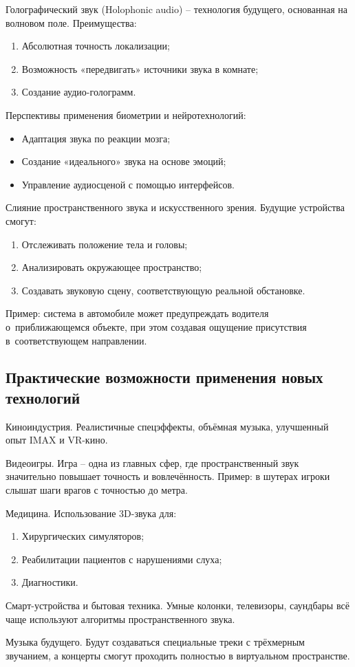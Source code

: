 \documentclass{ou}
\begin{document}
Голографический звук (Holophonic audio) -- технология будущего, основанная на волновом поле. Преимущества:
\begin{enumerate}[leftmargin=0em, itemindent=3.75em, nosep, label=\arabic*)]
\item Абсолютная точность локализации;
\item Возможность «передвигать» источники звука в комнате;
\item Создание аудио-голограмм.
\end{enumerate}

Перспективы применения биометрии и нейротехнологий:
\begin{itemize}[label=-, leftmargin=0em, itemindent=3.35em, nosep]
\item Адаптация звука по реакции мозга;
\item Создание «идеального» звука на основе эмоций;
\item Управление аудиосценой с помощью интерфейсов.
\end{itemize}

Слияние пространственного звука и искусственного зрения. Будущие устройства смогут:
\begin{enumerate}[leftmargin=0em, itemindent=3.75em, nosep, label=\arabic*)]
\item Отслеживать положение тела и головы;
\item Анализировать окружающее пространство;
\item Создавать звуковую сцену, соответствующую реальной обстановке.
\end{enumerate}

Пример: система в автомобиле может предупреждать водителя о~приближающемся объекте, при этом создавая ощущение присутствия в~соответствующем направлении.
\subsection{Практические возможности применения новых технологий}
Киноиндустрия. Реалистичные спецэффекты, объёмная музыка, улучшенный опыт IMAX и VR-кино.

Видеоигры. Игра -- одна из главных сфер, где пространственный звук значительно повышает точность и вовлечённость. Пример: в шутерах игроки слышат шаги врагов с точностью до метра.

Медицина. Использование 3D-звука для:
\begin{enumerate}[leftmargin=0em, itemindent=3.75em, nosep, label=\arabic*)]
\item Хирургических симуляторов;
\item Реабилитации пациентов с нарушениями слуха;
\item Диагностики.
\end{enumerate}

Смарт-устройства и бытовая техника. Умные колонки, телевизоры, саундбары всё чаще используют алгоритмы пространственного звука.

Музыка будущего. Будут создаваться специальные треки с трёхмерным звучанием, а концерты смогут проходить полностью в виртуальном пространстве.
\newpage
{
\sloppy
\nocite{*}
\cleardoublepage
{}


}
\end{document}

